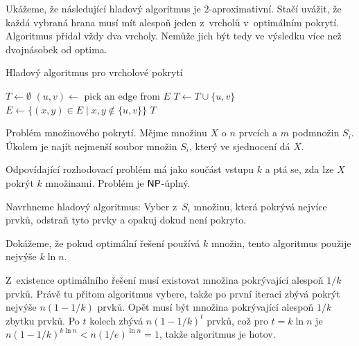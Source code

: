 \begin{example}
Ukážeme, že následující hladový algoritmus je $2$-aproximativní.  Stačí
uvážit, že každá vybraná hrana musí mít alespoň jeden z~vrcholů
v~optimálním pokrytí. Algoritmus přidal vždy dva vrcholy. Nemůže jich
být tedy ve výsledku více než dvojnásobek od optima.

\begin{algorithm}
\caption{Hladový algoritmus pro vrcholové pokrytí}
\begin{algorithmic}[1]
    \State $T \gets \emptyset$
        \State $(u,v) \gets$ pick an edge from $E$
        \State $T \gets T \cup \{u,v\}$
        \State $E \gets \{ (x,y) \in E \mid x,y \not \in \{u, v\} \}$
    \EndWhile
    \State \Return $T$
\EndFunction
\end{algorithmic}
\end{algorithm}
\end{example}

\begin{example}

    Problém množinového pokrytí. Mějme množinu $X$ o $n$ prvcích
    a $m$ podmnožin $S_i$. Úkolem je najít nejmenší soubor množin $S_i$,
    který ve sjednocení dá $X$.

    Odpovídající rozhodovací problém má jako součást vstupu $k$ a ptá
    se, zda lze $X$ pokrýt $k$ množinami. Problém je ${\mathsf{NP}}$-úplný.

    Navrhneme hladový algoritmus: Vyber z~$S_i$ množinu, která pokrývá
    nejvíce prvků, odstraň tyto prvky a opakuj dokud není pokryto.

    Dokážeme, že pokud optimální řešení používá $k$ množin, tento
    algoritmus použije nejvýše $k \ln n$.

    Z~existence optimálního řešení musí existovat množina pokrývající alespoň
    $1/k$ prvků. Právě tu přitom algoritmus vybere, takže po první
    iteraci zbývá pokrýt nejvýše $n(1 - 1/k)$ prvků.
    Opět musí být množina pokrývající alespoň $1/k$ zbytku prvků.
    Po $t$ kolech zbývá $n(1-1/k)^t$ prvků,
    což pro $t = k \ln n$ je $n(1-1/k)^{k \ln n} < n(1/e)^{\ln n} = 1$,
    takže algoritmus je hotov.
\end{example}

